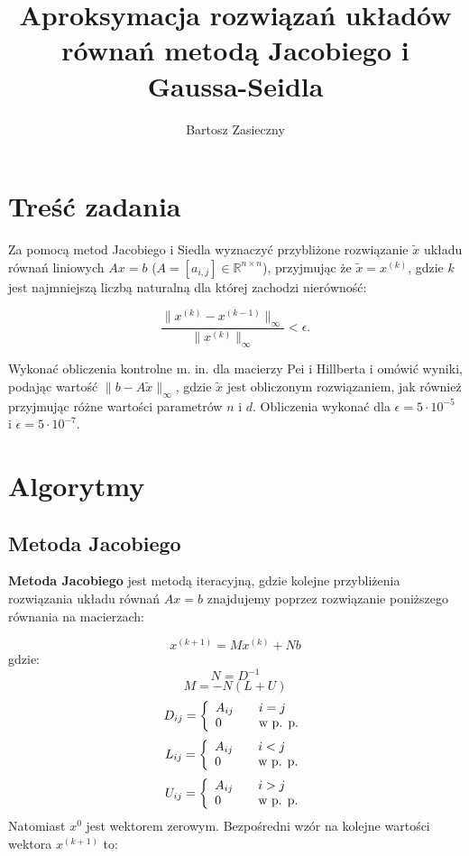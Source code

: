 \documentclass[a4paper,11pt]{article}
\title{Aproksymacja rozwiązań układów równań metodą Jacobiego i Gaussa-Seidla}
\author{Bartosz Zasieczny}
\newcommand{\norm}[1]{\lVert#1\rVert}
\begin{document}
\maketitle
\tableofcontents

\section{Treść zadania}

Za pomocą metod Jacobiego i Siedla wyznaczyć przybliżone rozwiązanie $ \tilde{x} $ 
układu równań liniowych $ Ax = b $ ($ A = [a_{i,j}] \in \mathbb{R}^{n \times n} $), 
przyjmując że $ \tilde{x} = x^{(k)} $, gdzie $ k $ jest najmniejszą liczbą naturalną 
dla której zachodzi nierówność:

$$ \frac{\norm{ x^{(k)} - x^{(k-1)}}_{\infty}}{\norm{x^{(k)}}_{\infty}} < \epsilon. $$

Wykonać obliczenia kontrolne m. in. dla macierzy Pei i Hillberta i omówić wyniki, 
podając wartość $ \norm{b - A \tilde{x}}_{\infty} $, gdzie $ \tilde{x} $ jest 
obliczonym rozwiązaniem, jak również przyjmując różne wartości parametrów $n$ i $d$.
Obliczenia wykonać dla $ \epsilon = 5 \cdot 10^{-5} $ i $ \epsilon = 5 \cdot 10^{-7} $.

\section{Algorytmy}
\subsection{Metoda Jacobiego}
  \textbf{Metoda Jacobiego} jest metodą iteracyjną, gdzie kolejne przybliżenia 
  rozwiązania układu równań $ Ax = b $ znajdujemy poprzez rozwiązanie poniższego 
  równania na macierzach:
  
  $$ x^{(k+1)} = Mx^{(k)} + Nb $$
  gdzie:
  $$ N = D^{-1} $$
  $$ M = -N(L+U) $$
  $$ 
  D_{ij} =  \left\{\begin{array}{l l}
        A_{ij} & \quad i=j \\
        0 & \quad \textrm{w p. p.}
        \end{array}\right.
  $$
  $$
  L_{ij} =  \left\{\begin{array}{l l}
        A_{ij} & \quad i < j \\
        0 & \quad \textrm{w p. p.}
        \end{array}\right.
  $$
  $$
  U_{ij} = \left\{\begin{array}{l l}
        A_{ij} & \quad i > j \\
        0 & \quad \textrm{w p. p.}
        \end{array}\right.
  $$
  Natomiast $ x^0 $ jest wektorem zerowym.
  Bezpośredni wzór na kolejne wartości wektora $x^{(k+1)}$ to:
  
\end{document}
